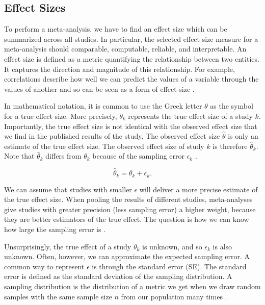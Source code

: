 \documentclass[../../../main.tex]{subfiles}
\begin{document}
\subsection{Effect Sizes}

To perform a meta-analysis, we have to find an effect size which can be summarized across all studies. In particular, the selected effect size measure for a meta-analysis should comparable, computable, reliable, and interpretable. An effect size is defined as a metric quantifying the relationship between two entities. It captures the direction and magnitude of this relationship. For example, correlations describe how well we can predict the values of a variable through the values of another and so can be seen as a form of effect size \autocite{Harrer2021}.

In mathematical notation, it is common to use the Greek letter $\theta$ as the symbol for a true effect size. More precisely, $\theta_k$ represents the true effect size of a study $k$. Importantly, the true effect size is not identical with the observed effect size that we find in the published results of the study. The observed effect size $\hat{\theta}$ is only an estimate of the true effect size. The observed effect size of study $k$ is therefore $\hat{\theta}_k$. Note that $\hat{\theta}_k$ differs from $\theta_k$ because of the sampling error $\epsilon_k$ \autocite{Harrer2021}.

\begin{equation}
\hat{\theta}_k = \theta_k + \epsilon_k.
\label{Equation:SampleError}
\end{equation}

We can assume that studies with smaller $\epsilon$ will deliver a more precise estimate of the true effect size. When pooling the results of different studies, meta-analyses give studies with greater precision (less sampling error) a higher weight, because they are better estimators of the true effect. The question is how we can know how large the sampling error is \autocite{Harrer2021}.

Unsurprisingly, the true effect of a study $\theta_k$ is unknown, and so $\epsilon_k$ is also unknown. Often, however, we can approximate the expected sampling error. A common way to represent $\epsilon$ is through the standard error (SE). The standard error is defined as the standard deviation of the sampling distribution. A sampling distribution is the distribution of a metric we get when we draw random samples with the same sample size $n$ from our population many times \autocite{Harrer2021}.
\end{document}
